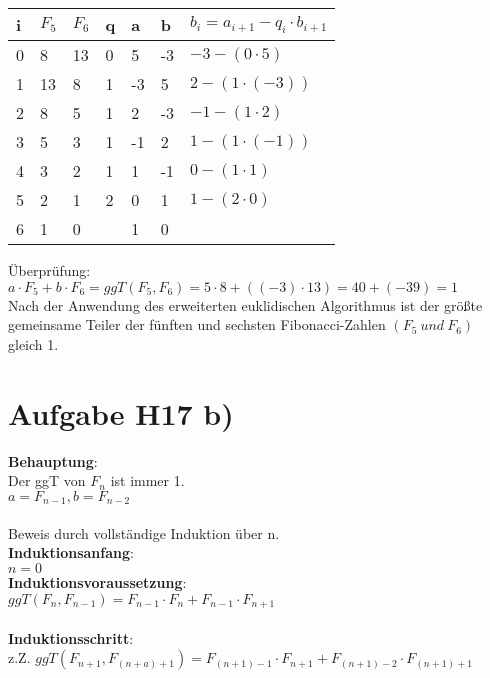 \documentclass[11pt,a4paper]{article}
\begin{document}
\begin{center}
	\begin{tabular}{ | l | l | l | l | l | l | l|}
		\hline
		i&$F_5$&$F_6$&q&a&b&$b_i=a_{i+1}-q_i \cdot b_{i+1} $ \\ \hline	\hline	
		0&8&13&0&5&-3&$-3-(0 \cdot 5 )$ \\ \hline
		1&13&8&1&-3&5&$2-(1 \cdot (-3) )$ \\ \hline
		2&8&5&1&2&-3&$-1-(1 \cdot 2)$\\ \hline
		3&5&3&1&-1&2&$1-(1 \cdot (-1))$ \\ \hline
		4&3&2&1&1&-1&$0-(1 \cdot 1)$ \\ \hline
		5&2&1&2&0&1&$1-(2\cdot 0)$ \\ \hline
		6&1&0&&1&0&\\ \hline
	\end{tabular}
\end{center}

Überprüfung:\\
$a\cdot F_5 +b \cdot F_6 = ggT(F_5,F_6) = 5 \cdot 8 + ((-3)\cdot 13) = 40+(-39)=1$\\
Nach der Anwendung des erweiterten euklidischen Algorithmus ist der größte gemeinsame Teiler der fünften und sechsten Fibonacci-Zahlen $(F_5~und~F_6)$ gleich 1.\\

\section*{Aufgabe H17 b)}
\textbf{Behauptung}: \\
Der ggT von $F_n$ ist immer 1.\\
$a=F_{n-1} , b= F_{n-2}$\\
\\
Beweis durch vollständige Induktion über n.\\
\textbf{Induktionsanfang}:\\
$n=0$
\\
\textbf{Induktionsvoraussetzung}:\\
$ggT(F_n, F_{n-1}) = F_{n-1} \cdot F_n+F_{n-1}\cdot F_{n+1}$\\
\\
\textbf{Induktionsschritt}:\\
z.Z.
$ggT(F_{n+1}, F_{(n+a)+1})=F_{(n+1)-1} \cdot F_{n+1} + F_{(n+1)-2} \cdot F_{(n+1)+1}$
\end{document}
